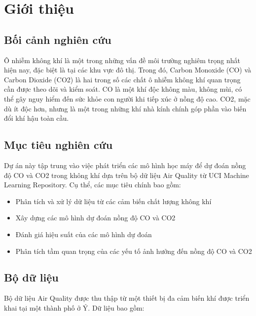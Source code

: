 \section{Giới thiệu}

\subsection{Bối cảnh nghiên cứu}
\hspace{0.5cm}Ô nhiễm không khí là một trong những vấn đề môi trường nghiêm trọng nhất hiện nay, đặc biệt là tại các khu vực đô thị. Trong đó, Carbon Monoxide (CO) và Carbon Dioxide (CO2) là hai trong số các chất ô nhiễm không khí quan trọng cần được theo dõi và kiểm soát. CO là một khí độc không màu, không mùi, có thể gây nguy hiểm đến sức khỏe con người khi tiếp xúc ở nồng độ cao. CO2, mặc dù ít độc hơn, nhưng là một trong những khí nhà kính chính góp phần vào biến đổi khí hậu toàn cầu.

\subsection{Mục tiêu nghiên cứu}
\hspace{0.5cm}Dự án này tập trung vào việc phát triển các mô hình học máy để dự đoán nồng độ CO và CO2 trong không khí dựa trên bộ dữ liệu Air Quality từ UCI Machine Learning Repository. Cụ thể, các mục tiêu chính bao gồm:

\begin{itemize}
    \item Phân tích và xử lý dữ liệu từ các cảm biến chất lượng không khí
    \item Xây dựng các mô hình dự đoán nồng độ CO và CO2
    \item Đánh giá hiệu suất của các mô hình dự đoán
    \item Phân tích tầm quan trọng của các yếu tố ảnh hưởng đến nồng độ CO và CO2
\end{itemize}

\subsection{Bộ dữ liệu}
\hspace{0.5cm}Bộ dữ liệu Air Quality được thu thập từ một thiết bị đa cảm biến khí được triển khai tại một thành phố ở Ý. Dữ liệu bao gồm:

